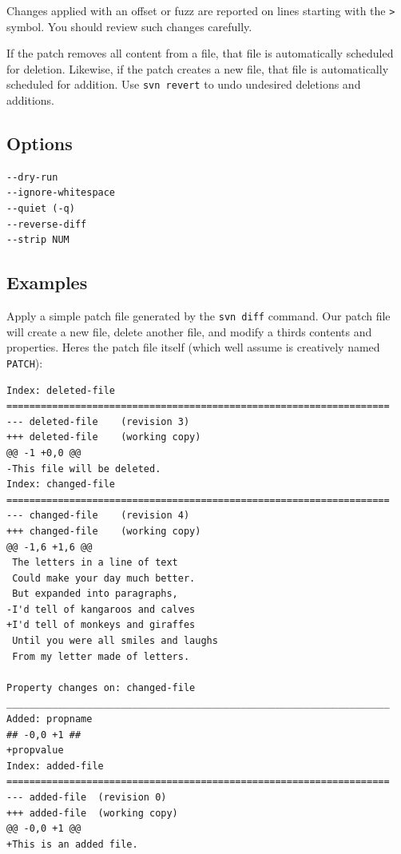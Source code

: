 Changes applied with an offset or fuzz are reported on lines starting
with the \textquotesingle{}\texttt{\textgreater{}}\textquotesingle{}
symbol. You should review such changes carefully.

If the patch removes all content from a file, that file is automatically
scheduled for deletion. Likewise, if the patch creates a new file, that
file is automatically scheduled for addition. Use \texttt{svn\ revert}
to undo undesired deletions and additions.

\subsection{Options}

\begin{verbatim}
--dry-run
--ignore-whitespace
--quiet (-q)
--reverse-diff
--strip NUM
\end{verbatim}

\subsection{Examples}

Apply a simple patch file generated by the \texttt{svn\ diff} command.
Our patch file will create a new file, delete another file, and modify a
third\textquotesingle s contents and properties. Here\textquotesingle s
the patch file itself (which we\textquotesingle ll assume is creatively
named \texttt{PATCH}):

\begin{verbatim}
Index: deleted-file
===================================================================
--- deleted-file    (revision 3)
+++ deleted-file    (working copy)
@@ -1 +0,0 @@
-This file will be deleted.
Index: changed-file
===================================================================
--- changed-file    (revision 4)
+++ changed-file    (working copy)
@@ -1,6 +1,6 @@
 The letters in a line of text
 Could make your day much better.
 But expanded into paragraphs,
-I'd tell of kangaroos and calves
+I'd tell of monkeys and giraffes
 Until you were all smiles and laughs
 From my letter made of letters.

Property changes on: changed-file
___________________________________________________________________
Added: propname
## -0,0 +1 ##
+propvalue
Index: added-file
===================================================================
--- added-file  (revision 0)
+++ added-file  (working copy)
@@ -0,0 +1 @@
+This is an added file.
\end{verbatim}

